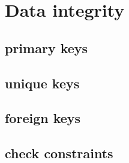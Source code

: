 \chapter{Data integrity}
\section{primary keys}
\section{unique keys}
\section{foreign keys}
\section{check constraints}